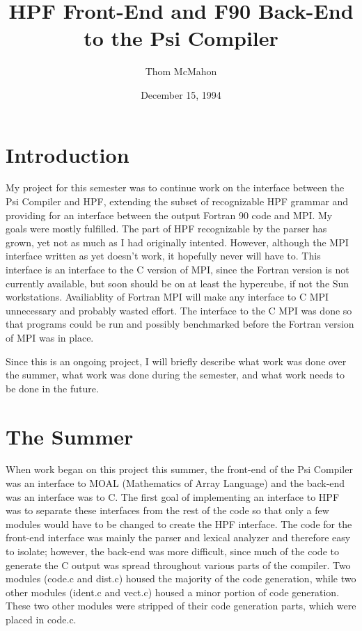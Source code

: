 
\title{HPF Front-End and F90 Back-End to the Psi Compiler}
\author{Thom McMahon}
\date{December 15, 1994}


\maketitle
\section{Introduction}
My project for this semester was to continue work on the interface between
the Psi Compiler and HPF, extending the subset of recognizable HPF 
grammar and providing for an interface between the output Fortran 90
code and MPI.  My goals were mostly fulfilled.  The part of HPF 
recognizable by the parser has grown, yet not as much as I had originally
intented.  However, although the MPI interface written as yet
doesn't work, it hopefully never will have to.  This interface is
an interface to the C version of MPI, since the Fortran version is
not currently available, but soon should be on at least the hypercube,
if not the Sun workstations.  Availiablity of Fortran MPI will
make any interface to C MPI unnecessary and probably wasted effort.
The interface to the C MPI was done so that programs could be run and
possibly benchmarked before the Fortran version of MPI was in place.

Since this is an ongoing project, I will briefly describe what work
was done over the summer, what work was done during the semester, and
what work needs to be done in the future.

\section{The Summer}
When work began on this project this summer, the front-end of the
Psi Compiler was an
interface to MOAL (Mathematics of Array Language) and the back-end was an
interface was to C.  The first goal of implementing an interface to
HPF was to separate these
interfaces from the rest of the code so that only a few modules would have
to be changed to create the HPF interface.  The code for the front-end
interface was mainly the parser and
lexical analyzer and therefore easy to isolate; however,
the back-end was more difficult, since much of the code to generate the
C output was spread throughout various parts of the compiler.  Two
modules (code.c and dist.c) housed the majority of the code generation,
while two other modules (ident.c and vect.c) housed a minor portion of
code generation.  These two other modules were stripped of their
code generation parts, which were placed in code.c.  

